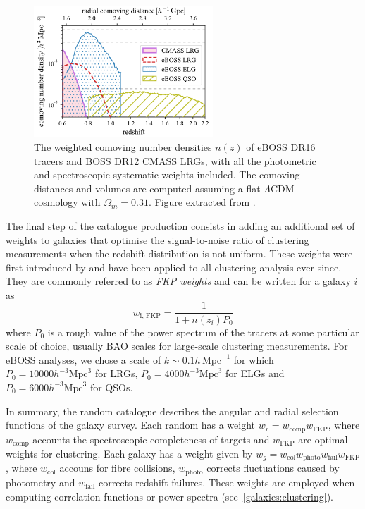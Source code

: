 \begin{figure}
    \centering 
    \includegraphics[width=0.6\textwidth]{fig/galaxies/eboss_z_distribution.png}
    \caption{ The weighted comoving number densities $\bar{n}(z)$ of eBOSS DR16 tracers
    and BOSS DR12 CMASS LRGs, with all the photometric and spectroscopic
    systematic weights included. 
    The comoving distances and volumes are computed assuming a flat-$\Lambda$CDM 
    cosmology with $\Omega_m = 0.31$. 
    Figure extracted from \cite{zhaoCompletedSDSSIVExtended2021}.} 
    \label{fig:eboss_z_distrib}
\end{figure}

The final step of the catalogue production consists in adding an additional set of weights 
to galaxies that optimise the signal-to-noise ratio of clustering measurements 
when the redshift distribution is not uniform. These weights were first introduced 
by \cite{feldmanPowerSpectrumAnalysisThreedimensional1994} and have been applied 
to all clustering analysis ever since. They are commonly referred to as 
\emph{FKP weights} and can be written for a galaxy $i$ as
\begin{equation}
    w_\text{i, FKP} = \frac{1}{1 + \bar{n}(z_i)P_0}
\end{equation}
where $P_0$ is a rough value of the power spectrum of the tracers at some 
particular scale of choice, usually BAO scales for large-scale clustering measurements.
For eBOSS analyses, we chose a scale of $k \sim 0.1 h\, \text{Mpc}^{-1}$ for which 
$P_0 = 10000 h^{-3}\text{Mpc}^{3}$ for LRGs, 
$P_0 = 4000 h^{-3}\text{Mpc}^{3}$ for ELGs and 
$P_0 = 6000 h^{-3} \text{Mpc}^{3}$ for QSOs. 

In summary, the random catalogue describes the angular and radial selection functions
of the galaxy survey. 
Each random has a weight $w_r = w_\text{comp} w_\text{FKP}$, where $w_\text{comp}$ accounts
the spectroscopic completeness of targets and $w_\text{FKP}$ are optimal weights for clustering. 
Each galaxy has a weight given by $w_g = w_\text{col} w_\text{photo} w_\text{fail} w_\text{FKP}$,
where $w_\text{col}$ accouns for fibre collisions, $w_\text{photo}$ corrects fluctuations caused 
by photometry and $w_\text{fail}$ corrects redshift failures. 
These weights are employed when computing correlation functions 
or power spectra (see~\ref{galaxies:clustering}).

